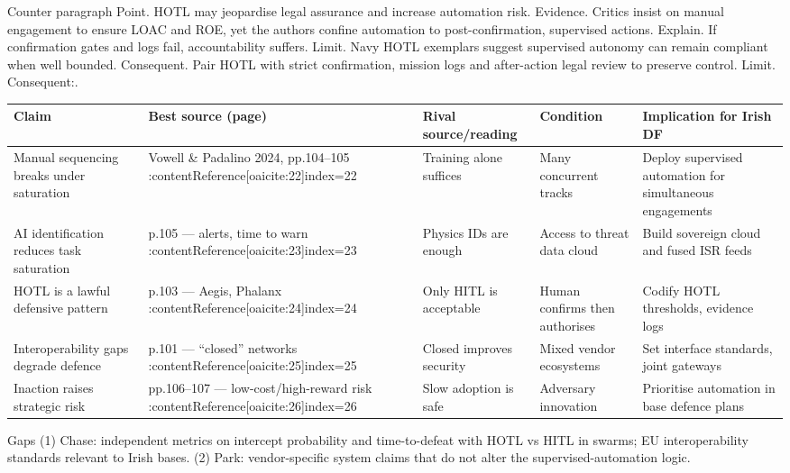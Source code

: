 Counter paragraph
Point. HOTL may jeopardise legal assurance and increase automation risk.
Evidence. Critics insist on manual engagement to ensure LOAC and ROE, yet the authors confine automation to post-confirmation, supervised actions. {\small }
Explain. If confirmation gates and logs fail, accountability suffers.
Limit. Navy HOTL exemplars suggest supervised autonomy can remain compliant when well bounded. {\small }
Consequent. Pair HOTL with strict confirmation, mission logs and after-action legal review to preserve control. Limit. Consequent:.


\begin{tabular}{p{3.2cm}p{4.2cm}p{3.6cm}p{3.2cm}p{4.2cm}}
	\textbf{Claim} & \textbf{Best source (page)} & \textbf{Rival source/reading} & \textbf{Condition} & \textbf{Implication for Irish DF}\\\hline
	Manual sequencing breaks under saturation & Vowell \& Padalino 2024, pp.104–105 {\small :contentReference[oaicite:22]{index=22}} & Training alone suffices & Many concurrent tracks & Deploy supervised automation for simultaneous engagements \\
	AI identification reduces task saturation & p.105 — alerts, time to warn {\small :contentReference[oaicite:23]{index=23}} & Physics IDs are enough & Access to threat data cloud & Build sovereign cloud and fused ISR feeds \\
	HOTL is a lawful defensive pattern & p.103 — Aegis, Phalanx {\small :contentReference[oaicite:24]{index=24}} & Only HITL is acceptable & Human confirms then authorises & Codify HOTL thresholds, evidence logs \\
	Interoperability gaps degrade defence & p.101 — “closed” networks {\small :contentReference[oaicite:25]{index=25}} & Closed improves security & Mixed vendor ecosystems & Set interface standards, joint gateways \\
	Inaction raises strategic risk & pp.106–107 — low-cost/high-reward risk {\small :contentReference[oaicite:26]{index=26}} & Slow adoption is safe & Adversary innovation & Prioritise automation in base defence plans \\\hline
\end{tabular}

Gaps
(1) Chase: independent metrics on intercept probability and time-to-defeat with HOTL vs HITL in swarms; EU interoperability standards relevant to Irish bases.
(2) Park: vendor-specific system claims that do not alter the supervised-automation logic.

\parencite{HARK_2000}

